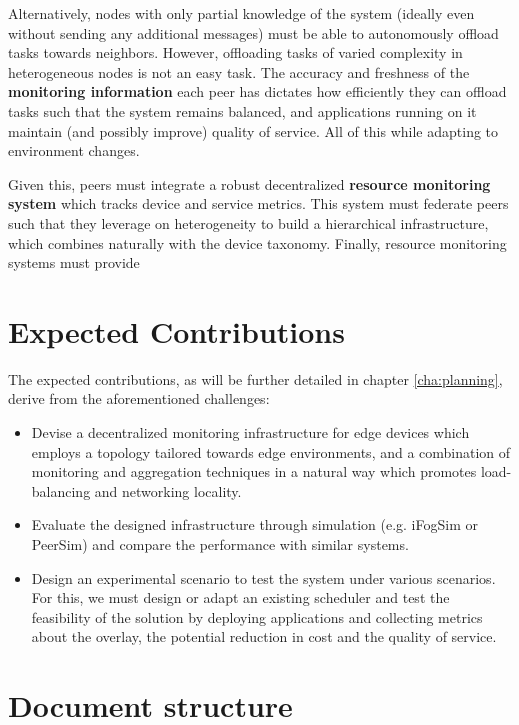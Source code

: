 Alternatively, nodes with only partial knowledge of the system (ideally even without sending any additional messages) must be able to autonomously offload tasks towards neighbors. However, offloading tasks of varied complexity in heterogeneous nodes is not an easy task. The accuracy and freshness of the \textbf{monitoring information} each peer has dictates how efficiently they can offload tasks such that the system remains balanced, and applications running on it maintain (and possibly improve) quality of service. All of this while adapting to environment changes. 

Given this, peers must integrate a robust decentralized \textbf{resource monitoring system} which tracks device and service metrics. This system must federate peers such that they leverage on heterogeneity to build a hierarchical infrastructure, which combines naturally with the device taxonomy. Finally, resource monitoring systems must provide 

\section{Expected Contributions}

The expected contributions, as will be further detailed in chapter \ref{cha:planning}, derive from the aforementioned challenges:

\begin{itemize}

    \item Devise a decentralized monitoring infrastructure for edge devices which employs a topology tailored towards edge environments, and a combination of monitoring and aggregation techniques in a natural way which promotes load-balancing and networking locality.
    
    \item Evaluate the designed infrastructure through simulation (e.g. iFogSim or PeerSim) and compare the performance with similar systems.

    \item Design an experimental scenario to test the system under various scenarios. For this, we must design or adapt an existing scheduler and test the feasibility of the solution by deploying applications and collecting metrics about the overlay, the potential reduction in cost and the quality of service.
    
\end{itemize}

\section{Document structure}

